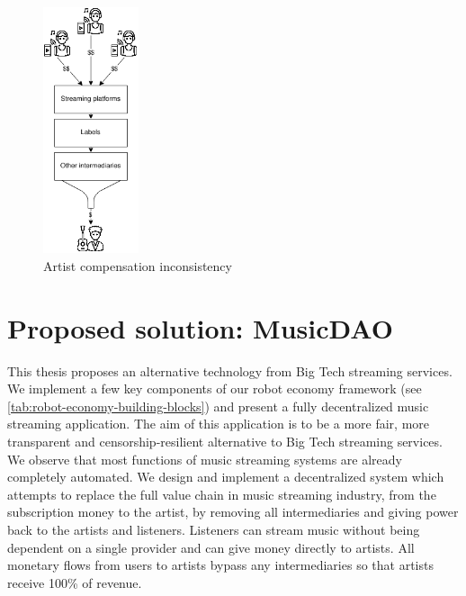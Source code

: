 \begin{figure}
    \centering
	\includegraphics[width=0.25\textwidth]{introduction/problem-image-2.png}
	\caption{Artist compensation inconsistency}
\end{figure}

\section{Proposed solution: MusicDAO}
This thesis proposes an alternative technology from Big Tech streaming services. We implement a few key components of our robot economy framework (see \ref{tab:robot-economy-building-blocks}) and present a fully decentralized music streaming application. The aim of this application is to be a more fair, more transparent and censorship-resilient alternative to Big Tech streaming services. We observe that most functions of music streaming systems are already completely automated. We design and implement a decentralized system which attempts to replace the full value chain in music streaming industry, from the subscription money to the artist, by removing all intermediaries and giving power back to the artists and listeners. Listeners can stream music without being dependent on a single provider and can give money directly to artists. All monetary flows from users to artists bypass any intermediaries so that artists receive 100\% of revenue.


